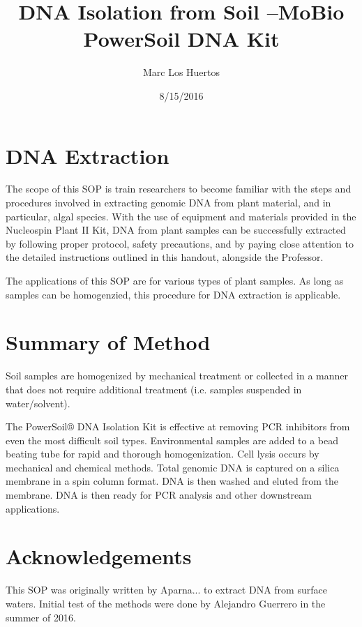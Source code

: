 \documentclass[12pt]{../SOP3_alpha}
\title{DNA Isolation from Soil --MoBio PowerSoil DNA Kit}
\date{8/15/2016}
\author{Marc Los Huertos}
\begin{document}


\maketitle

\section{DNA Extraction }

\NP The scope of this SOP is train researchers to become familiar with the steps and procedures involved in extracting genomic DNA from plant material, and in particular, algal species. With the use of equipment and materials provided in the Nucleospin Plant II Kit, DNA from plant samples can be successfully extracted by following proper protocol, safety precautions, and by paying close attention to the detailed instructions outlined in this handout, alongside the Professor. 

\NP The applications of this SOP are for various types of plant samples. As long as samples can be homogenzied, this procedure for DNA extraction is applicable. 

\section{Summary of Method}

Soil samples are homogenized by mechanical treatment or collected in a manner that does not require additional treatment (i.e. samples suspended in water/solvent). 

The PowerSoil® DNA Isolation Kit is effective at removing PCR inhibitors from even
the most difficult soil types. Environmental samples are added to a bead beating
tube for rapid and thorough homogenization. Cell lysis occurs by mechanical and
chemical methods. Total genomic DNA is captured on a silica membrane in a spin
column format. DNA is then washed and eluted from the membrane. DNA is then
ready for PCR analysis and other downstream applications. 

\tableofcontents

\newpage

\section{Acknowledgements}

\NP This SOP was originally written by Aparna... to extract DNA from surface waters. Initial test of the methods were done by Alejandro Guerrero in the summer of 2016. 
\end{document}
